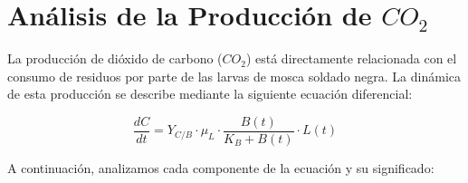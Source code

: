 \documentclass[12pt]{article}
\begin{document}
\section{Análisis de la Producción de $CO_2$}

La producción de dióxido de carbono ($CO_2$) está directamente relacionada con el consumo de residuos por parte de las larvas de mosca soldado negra. La dinámica de esta producción se describe mediante la siguiente ecuación diferencial:

\begin{equation}
    \frac{dC}{dt} = Y_{C/B} \cdot \mu_L \cdot \frac{B(t)}{K_B + B(t)} \cdot L(t)
\end{equation}

A continuación, analizamos cada componente de la ecuación y su significado:
\end{document}
